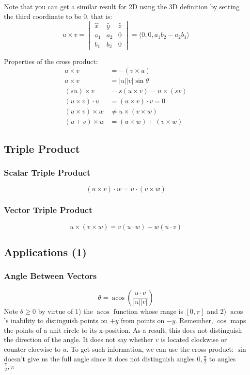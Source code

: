 \documentclass[12pt]{report}
\DeclareMathOperator{\acos}{acos}
\begin{document}
Note that you can get a similar result for 2D using the 3D definition by setting the third coordinate to be $0$, that is:
$$
u \times v =  \begin{vmatrix}\hat{x} & \hat{y} & \hat{z} \\ a_1 & a_2 & 0 \\ b_1 & b_2 & 0\end{vmatrix} = \langle 0, 0, a_1b_2 - a_2b_1\rangle
$$

Properties of the cross product:
\begin{align*}
u \times v &= -(v \times u)\\
u \times v &= |u||v|\sin\theta\\
(su) \times v &= s(u \times v) = u \times (sv)\\
(u \times v) \cdot u &= (u \times v) \cdot v = 0 \\
(u \times v) \times w &\neq u \times (v \times w) \\
(u + v)\times w &= (u \times w) + (v \times w)
\end{align*}
\subsection{Triple Product}
\subsubsection{Scalar Triple Product}
$$(u \times v) \cdot w = u \cdot (v \times w)$$
\subsubsection{Vector Triple Product}
$$u \times (v \times w) = v(u \cdot w) - w(u \cdot v)$$
\subsection{Applications (1)}
	\subsubsection{Angle Between Vectors}
	$$
	\theta = \acos\left(\frac{u \cdot v}{|u||v|}\right)
	$$
	Note $\theta \geq 0$ by virtue of 1) the $\acos$ function whose range is $[0, \pi]$ and 2) $\acos$'s inability to distinguish points on $+y$ from points on $-y$. Remember, $\cos$ maps the points of a unit circle to its x-position. As a result, this does not distinguish the direction of the angle. It does not say whether $v$ is located clockwise or counter-clocwise to $u$. To get such information, we can use the cross product:
	$\sin$ doesn't give us the full angle since it does not distinguish angles $0, \frac{\pi}{2}$ to angles $\frac{\pi}{2}, \pi$
	
\end{document}
